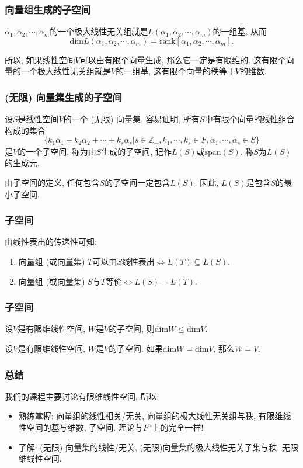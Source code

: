 \documentclass[CJK]{beamer}
\begin{document}
\begin{frame}
	\frametitle{向量组生成的子空间} \pause
	\begin{theorem}
		$\alpha_{1}, \alpha_{2}, \cdots, \alpha_{m}$的一个极大线性无关组就是$L(\alpha_{1}, \alpha_{2}, \cdots, \alpha_{m})$的一组基, 从而\[
		\mathrm{dim}L(\alpha_{1}, \alpha_{2}, \cdots, \alpha_{m})=\mathrm{rank}[\alpha_{1}, \alpha_{2}, \cdots, \alpha_{m}].\]	
	\end{theorem} \pause
	
	所以, 如果线性空间$V$可以由有限个向量生成, 那么它一定是有限维的. 这有限个向量的一个极大线性无关组就是$V$的一组基, 这有限个向量的秩等于$V$的维数.
\end{frame}

\begin{frame}
	\frametitle{(无限) 向量集生成的子空间} \pause
	\begin{definition}
		设$S$是线性空间$V$的一个 (无限) 向量集. 容易证明, 所有$S$中有限个向量的线性组合构成的集合\[\{k_{1}\alpha_{1}+k_{2}\alpha_{2}+\cdots+k_{s}\alpha_{s}|s\in\mathbb{Z_{+}}, k_{1}, \cdots, k_{s}\in F, \alpha_{1}, \cdots, \alpha_{s}\in S\}\]
		是$V$的一个子空间, 称为由$S$生成的子空间, 记作$L(S)$或$\mathrm{span}(S)$. 称$S$为$L(S)$的生成元. \pause
		
		\vspace{0.5cm}
		
		由子空间的定义, 任何包含$S$的子空间一定包含$L(S)$. 因此, $L(S)$是包含$S$的最小子空间. 
	\end{definition}
\end{frame}

\begin{frame}
	\frametitle{子空间} \pause
	由线性表出的传递性可知:
	\begin{theorem}
		\begin{enumerate}
			\item 向量组 (或向量集) $T$可以由$S$线性表出$\Longleftrightarrow L(T)\subseteq L(S)$.
			\item 向量组 (或向量集) $S$与$T$等价$\Longleftrightarrow L(S)=L(T)$.
		\end{enumerate}
		
	\end{theorem}
\end{frame}

\begin{frame}
	\frametitle{子空间} \pause
	\begin{theorem}
		设$V$是有限维线性空间, $W$是$V$的子空间, 则$\mathrm{dim}W\leqslant\mathrm{dim}V$. \pause
	\end{theorem}
	
	\begin{theorem}
		设$V$是有限维线性空间, $W$是$V$的子空间. 如果$\mathrm{dim}W=\mathrm{dim}V$, 那么$W=V$.
	\end{theorem}
\end{frame}

\begin{frame}
	\frametitle{总结}\pause
	我们的课程主要讨论有限维线性空间, 所以: \pause
	\begin{itemize}
		\item 熟练掌握: 向量组的线性相关/无关, 向量组的极大线性无关组与秩, 有限维线性空间的基与维数, 子空间. 理论与$F^{n}$上的完全一样! \pause
		
		\item 了解: (无限) 向量集的线性/无关, (无限)向量集的极大线性无关子集与秩, 无限维线性空间.
	\end{itemize}
\end{frame}
\end{document}
